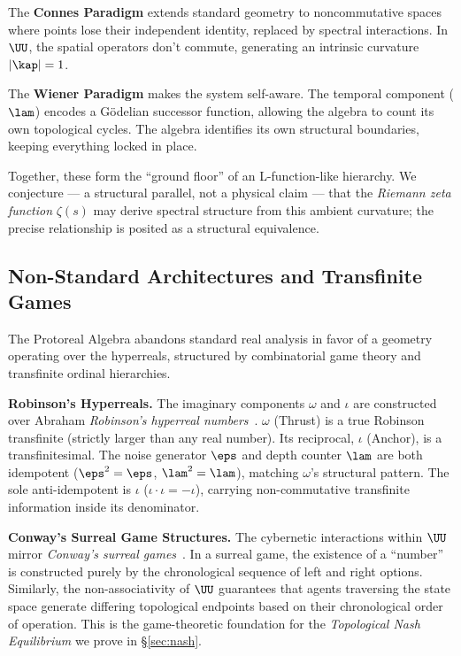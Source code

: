 The \textbf{Connes Paradigm} extends standard geometry to noncommutative spaces where points lose their independent identity, replaced by spectral interactions. In $\UU$, the spatial operators don't commute, generating an intrinsic curvature $|\kap| = 1$.

The \textbf{Wiener Paradigm} makes the system self-aware. The temporal component ($\lam$) encodes a G\"odelian successor function, allowing the algebra to count its own topological cycles. The algebra identifies its own structural boundaries, keeping everything locked in place.

Together, these form the ``ground floor'' of an L-function-like hierarchy. We conjecture --- a structural parallel, not a physical claim --- that the \emph{Riemann zeta function} $\zeta(s)$ may derive spectral structure from this ambient curvature; the precise relationship is posited as a structural equivalence.

\subsection{Non-Standard Architectures and Transfinite Games}

The Protoreal Algebra abandons standard real analysis in favor of a geometry operating over the hyperreals, structured by combinatorial game theory and transfinite ordinal hierarchies.

\textbf{Robinson's Hyperreals.} The imaginary components $\omega$ and $\iota$ are constructed over Abraham \emph{Robinson's hyperreal numbers}~\cite{robinson}. $\omega$ (Thrust) is a true Robinson transfinite (strictly larger than any real number). Its reciprocal, $\iota$ (Anchor), is a transfinitesimal. The noise generator $\eps$ and depth counter $\lam$ are both idempotent ($\eps^2 = \eps$, $\lam^2 = \lam$), matching $\omega$'s structural pattern. The sole anti-idempotent is $\iota$ ($\iota \cdot \iota = -\iota$), carrying non-commutative transfinite information inside its denominator.

\textbf{Conway's Surreal Game Structures.} The cybernetic interactions within $\UU$ mirror \emph{Conway's surreal games}~\cite{conway}. In a surreal game, the existence of a ``number'' is constructed purely by the chronological sequence of left and right options. Similarly, the non-associativity of $\UU$ guarantees that agents traversing the state space generate differing topological endpoints based on their chronological order of operation. This is the game-theoretic foundation for the \emph{Topological Nash Equilibrium} we prove in \S\ref{sec:nash}.

